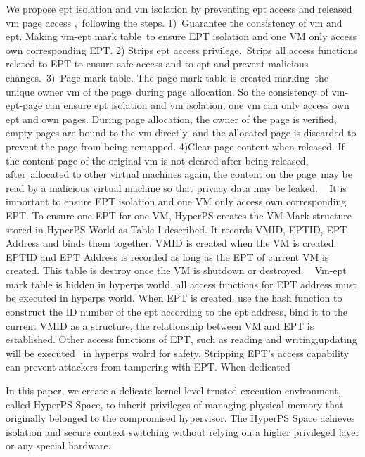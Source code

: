We propose ept isolation and vm isolation by preventing ept access and released vm page access , following the steps. 1) Guarantee the consistency of vm and ept. Making vm-ept mark table to ensure EPT isolation and one VM only access own corresponding EPT. 2) Strips ept access privilege. Strips all access functions related to EPT to ensure safe access and to ept and prevent malicious changes. 3) Page-mark table. The page-mark table is created marking the unique owner vm of the page during page allocation. So the consistency of vm-ept-page can ensure ept isolation and vm isolation, one vm can only access own ept and own pages. During page allocation, the owner of the page is verified, empty pages are bound to the vm directly, and the allocated page is discarded to prevent the page from being remapped. 4)Clear page content when released. If the content page of the original vm is not cleared after being released, after allocated to other virtual machines again, the content on the page may be read by a malicious virtual machine so that privacy data may be leaked.
 
It is important to ensure EPT isolation and one VM only access own corresponding EPT. To ensure one EPT for one VM, HyperPS creates the VM-Mark structure stored in HyperPS World as Table I described. It records VMID, EPTID, EPT Address and binds them together. VMID is created when the VM is created. EPTID and EPT Address is recorded as long as the EPT of current VM is created. This table is destroy once the VM is shutdown or destroyed.
 
Vm-ept mark table is hidden in hyperps world. all access functions for EPT address must be executed in hyperps world. When EPT is created, use the hash function to construct the ID number of the ept according to the ept address, bind it to the current VMID as a structure, the relationship between VM and EPT is established. Other access functions of EPT, such as reading and writing,updating will be executed  in hyperps wolrd for safety.
Stripping EPT's access capability can prevent attackers from tampering with EPT. When dedicated
\fi


In this paper, we create a delicate kernel-level trusted execution environment, called HyperPS Space, to inherit privileges of managing physical memory that originally belonged to the compromised hypervisor. 
The HyperPS Space achieves isolation and secure context switching without relying on a higher privileged layer or any special hardware. 

